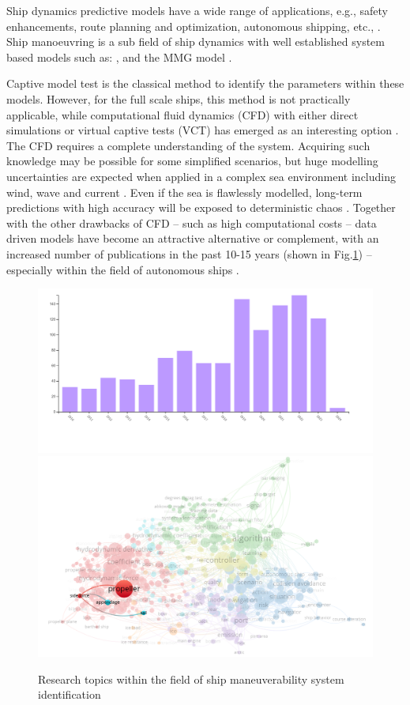 Ship dynamics predictive models have a wide range of applications, e.g., safety enhancements, route planning and optimization, autonomous shipping, etc., \citep{aslam_internet_2020}.
Ship manoeuvring is a sub field of ship dynamics with well established system based models such as: \citet{abkowitz_ship_1964,nomoto_steering_1957,norrbin_theory_1971}, and the MMG model \citep{yasukawa_introduction_2015}.

Captive model test is the classical method to identify the parameters within these models. However, for the full scale ships, this method is not practically applicable, while computational fluid dynamics (CFD) with either direct simulations or virtual captive tests (VCT) has emerged as an interesting option \citep{liu_predictions_2018,li_ship_2022}.
The CFD requires a complete understanding of the system. Acquiring such knowledge may be possible for some simplified scenarios, but huge modelling uncertainties are expected when applied in a complex sea environment including wind, wave and current \citep{miller_ship_2021}. 
Even if the sea is flawlessly modelled, long-term predictions with high accuracy will be exposed to deterministic chaos \citep{lorenz_deterministic_1963}.
Together with the other drawbacks of CFD -- such as high computational costs -- data driven models have become an attractive alternative or complement, with an increased number of publications in the past 10-15 years (shown in Fig.\ref{fig:pub_overview}) -- especially within the field of autonomous ships \citep{ahmed_survey_2023}.
%
\begin{figure}[h]
  \includegraphics[width=.5\textwidth]{figures/trendinyear.jpg}
  \includegraphics[width=.5\textwidth]{figures/wind_drift_research.png}
  \caption{Research topics within the field of ship maneuverability system identification}
  \label{fig:pub_overview}
\end{figure}
%

